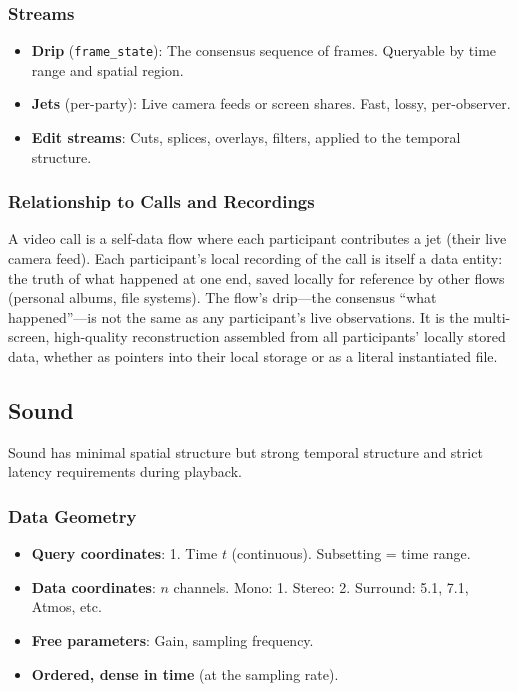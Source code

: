 \documentclass[11pt, letterpaper]{article}
\begin{document}
\subsubsection{Streams}
\begin{itemize}[leftmargin=2em]
  \item \textbf{Drip} (\texttt{frame\_state}): The consensus sequence of frames.
    Queryable by time range and spatial region.
  \item \textbf{Jets} (per-party): Live camera feeds or screen shares. Fast, lossy,
    per-observer.
  \item \textbf{Edit streams}: Cuts, splices, overlays, filters, applied to the
    temporal structure.
\end{itemize}

\subsubsection{Relationship to Calls and Recordings}

A video call is a self-data flow where each participant contributes a jet (their live
camera feed). Each participant's local recording of the call is itself a data entity:
the truth of what happened at one end, saved locally for reference by other flows
(personal albums, file systems). The flow's drip---the consensus ``what happened''---is
not the same as any participant's live observations. It is the multi-screen,
high-quality reconstruction assembled from all participants' locally stored data, whether
as pointers into their local storage or as a literal instantiated file.

\subsection{Sound}
\label{sec:ex-sound}

Sound has minimal spatial structure but strong temporal structure and strict latency
requirements during playback.

\subsubsection{Data Geometry}
\begin{itemize}[leftmargin=2em]
  \item \textbf{Query coordinates}: 1. Time $t$ (continuous). Subsetting = time range.
  \item \textbf{Data coordinates}: $n$ channels. Mono: 1. Stereo: 2. Surround: 5.1,
    7.1, Atmos, etc.
  \item \textbf{Free parameters}: Gain, sampling frequency.
  \item \textbf{Ordered, dense in time} (at the sampling rate).
\end{itemize}
\end{document}
